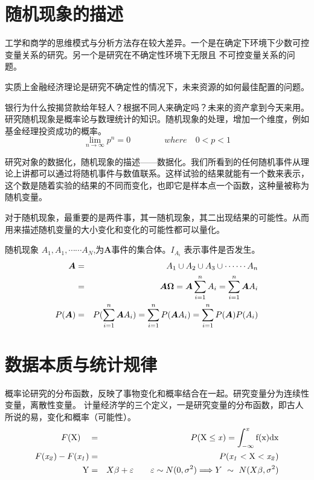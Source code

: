 \section{随机现象的描述}
 工学和商学的思维模式与分析方法存在较大差异。一个是在确定下环境下少数可控变量关系的研究。另一个是研究在不确定性环境下无限且
不可控变量关系的问题。

实质上金融经济理论是研究不确定性的情况下，未来资源的如何最佳配置的问题。

银行为什么按揭贷款给年轻人？根据不同人来确定吗？未来的资产拿到今天来用。
研究随机现象是概率论与数理统计的知识。随机现象的处理，增加一个维度，例如基金经理投资成功的概率。
\begin{equation*}
	\lim_{n \to \infty} p^n =0  \qquad  \qquad  where \quad 0<p<1
\end{equation*}

研究对象的数据化，随机现象的描述——数据化。我们所看到的任何随机事件从理论上讲都可以通过将随机事件与数值联系。这样试验的结果就能有一个数来表示，
这个数是随着实验的结果的不同而变化，也即它是样本点一个函数，这种量被称为随机变量。

对于随机现象，最重要的是两件事，其一随机现象，其二出现结果的可能性。从而用来描述随机变量的大小变化和变化的可能性都可以量化。

随机现象 $A_1 , A_1 ,\cdots \cdots A_N $,为$ \boldsymbol{ A }$事件的集合体。$ I_{A_i} $ 表示事件是否发生。
	\begin{eqnarray}
		\boldsymbol{A} & =  & A_1  \cup  A_2 \cup A_3 \cup \cdots \cdots A_n  \notag\\ 
		& =  & \boldsymbol{A \Omega} = \boldsymbol{A}\sum_{i = 1}^{n} A_i = \sum_{i = 1}^{n} \boldsymbol{A} A_i \notag \\
		P(\boldsymbol{A}) & =  & P(\sum_{i = 1}^{n} \boldsymbol{A} A_i ) = 
		\sum_{i = 1}^{n} P(\boldsymbol{A} A_i) = \sum_{i = 1}^{n} P(\boldsymbol{A})P( A_i) \notag 
	\end{eqnarray}

\section{数据本质与统计规律}
概率论研究的分布函数，反映了事物变化和概率结合在一起。研究变量分为连续性变量，离散性变量。
计量经济学的三个定义，一是研究变量的分布函数，即古人所说的易，变化和概率（可能性）。
\begin{eqnarray}
	F(\mathrm {X} ) \quad & =  & P(\rm {X} \le \mathit{x} ) = \int_{-\infty }^{\mathit{x} } f(x)dx \notag \\
	F(\mathit{x_2}) - F(\mathit{x_1}) & =  &P(\mathit{x_1} <\rm X<\mathit{x_2}) \notag  \\
	\rm { Y }  & =  & X\beta + \varepsilon \qquad  \varepsilon \sim N(0,\sigma^ 2) 
\Longrightarrow Y ~\sim ~N(X\beta,\sigma^ 2)
\end{eqnarray}


